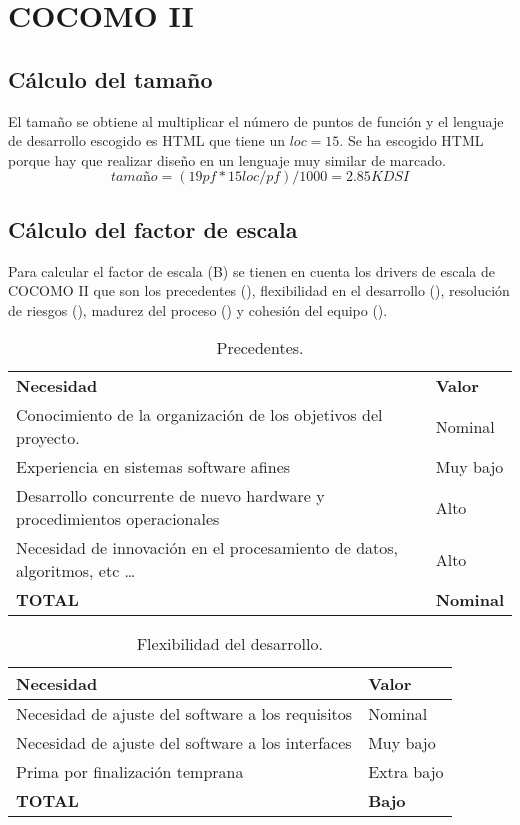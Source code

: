 \section{COCOMO II}
\subsection{Cálculo del tamaño}
\par El tamaño se obtiene al multiplicar el número de puntos de función y el lenguaje de desarrollo escogido es HTML que tiene un $loc=15$. Se ha escogido HTML porque hay que realizar diseño en un lenguaje muy similar de marcado.
$$ tamaño = (19pf * 15loc/pf)/1000 = 2.85KDSI $$


\subsection{Cálculo del factor de escala}
\par Para calcular el factor de escala (B) se tienen en cuenta los drivers de escala de COCOMO II que son los precedentes (\label{tab:precedentes}), flexibilidad en el desarrollo (\label{tab:flexibilidad}), resolución de riesgos (\label{tab:riesgos}), madurez del proceso (\label{tab:madurez}) y cohesión del equipo (\label{tab:cohesion}).

\begin{table}[h]
\begin{center}
\begin{tabular}{ l l }
\textbf{Necesidad} & \textbf{Valor} \\
Conocimiento de la organización de los objetivos del proyecto. & Nominal \\
Experiencia en sistemas software afines & Muy bajo \\
Desarrollo concurrente de nuevo hardware y procedimientos operacionales & Alto \\
Necesidad de innovación en el procesamiento de datos, algoritmos, etc … & Alto \\
\textbf{TOTAL} & \textbf{Nominal} \\
\end{tabular}
\caption{Precedentes.}
\label{tab:precedentes}
\end{center}
\end{table}

\begin{table}[h]
\begin{center}
\begin{tabular}{ l l }
\textbf{Necesidad} & \textbf{Valor} \\ \hline
Necesidad de ajuste del software a los requisitos &
Nominal\\
Necesidad de ajuste del software a los interfaces &
Muy bajo\\
Prima por finalización temprana &
Extra bajo\\ \hline
\textbf{TOTAL} & \textbf{Bajo} \\ \hline
\end{tabular}
\caption{Flexibilidad del desarrollo.}
\label{tab:flexibilidad}
\end{center}
\end{table}

